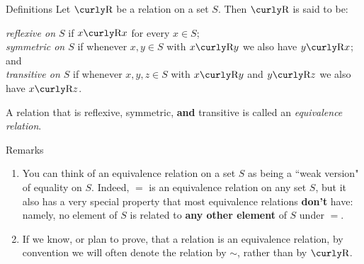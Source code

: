 \begin{df}{Definitions} Let $\R$ be a relation on a set $S$. Then $\R$ is said to
be:

 \textit{reflexive on $S$} if $x\R x$ for every $x\in S$;\\
\indent \textit{symmetric on $S$} if whenever $x,y\in S$ with $x\R y$
we also have $y\R x$; and \\ \indent \textit{transitive on $S$} if
whenever $x,y,z\in S$ with $x\R y$ and $y\R z$ we also have $x\R z$.


\noindent
 A relation that is reflexive,
symmetric, \textbf{and} transitive is called an \textit{equivalence
relation}.\end{df}


\begin{df}{Remarks}\

\begin{enumerate} \item You can think of an
equivalence relation on a set $S$ as being a ``weak version" of
equality on $S$.  Indeed, $=$ is an equivalence relation on any set
$S$, but it also has a very special property that most equivalence
relations \textbf{don't} have: namely, no element of $S$ is related to
\textbf{any other element} of $S$ under $=$.

\item If we know, or plan to prove, that a relation is an equivalence
relation, by convention we will often denote the relation by $\sim$,
rather than by $\R$.
\end{enumerate}\end{df}


